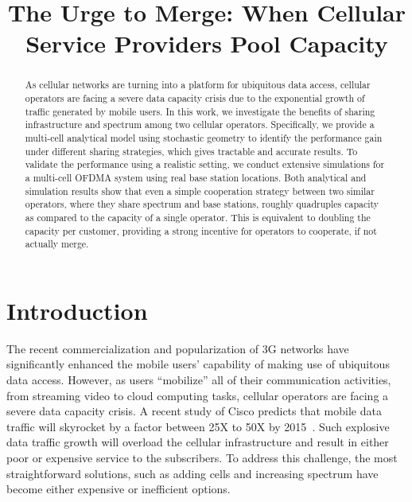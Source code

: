 \documentclass[conference]{IEEEtran}
\begin{document}
\title{The Urge to Merge: When Cellular Service Providers Pool Capacity}


\author{
}













\maketitle

\begin{abstract}
As cellular networks are turning into a platform for ubiquitous data access, cellular operators are facing a severe data capacity crisis due to the exponential growth of traffic generated by mobile users. In this work, we investigate the benefits of sharing infrastructure and spectrum among two cellular operators. Specifically, we provide a multi-cell analytical model using stochastic geometry to identify the performance gain under different sharing strategies, which gives tractable and accurate results. To validate the performance using a realistic setting, we conduct extensive simulations for a multi-cell OFDMA system using real base station locations. Both analytical and simulation results show that even a simple cooperation strategy between two similar operators, where they share spectrum and base stations, roughly quadruples capacity as compared to the capacity of a single operator. This is equivalent to doubling the capacity per customer, providing a strong incentive for operators to cooperate, if not actually merge.
\end{abstract}
\vspace{-0.1in}







\IEEEpeerreviewmaketitle



\section{Introduction}

The recent commercialization and popularization of 3G networks have significantly enhanced the mobile users' capability of making use of ubiquitous data access. However, as users ``mobilize'' all of their communication activities, from streaming video to cloud computing tasks, cellular operators are facing a severe data capacity crisis. A recent study of Cisco predicts that mobile data traffic will skyrocket by a factor between 25X to 50X by 2015~\cite{CiscoForecast}. Such explosive data traffic growth will overload the cellular infrastructure and result in either poor or expensive service to the subscribers. To address this challenge, the most straightforward solutions, such as adding cells and increasing spectrum have become either expensive or inefficient options.
\end{document}
